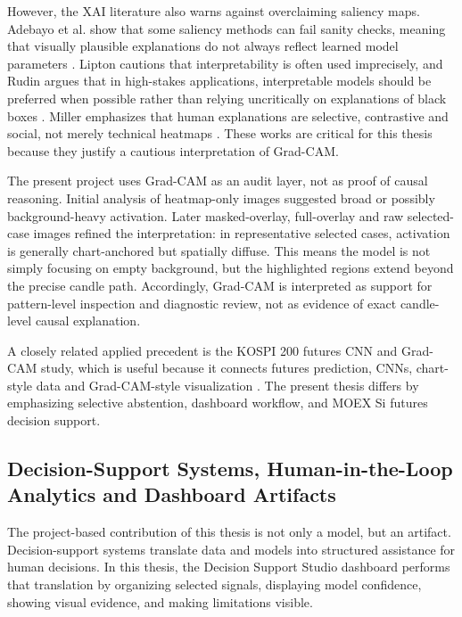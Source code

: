 However, the XAI literature also warns against overclaiming saliency maps. Adebayo et al. show that some saliency methods can fail sanity checks, meaning that visually plausible explanations do not always reflect learned model parameters \cite{adebayo_sanity_checks}. Lipton cautions that interpretability is often used imprecisely, and Rudin argues that in high-stakes applications, interpretable models should be preferred when possible rather than relying uncritically on explanations of black boxes \cite{lipton_mythos,rudin_black_boxes}. Miller emphasizes that human explanations are selective, contrastive and social, not merely technical heatmaps \cite{miller_explanation}. These works are critical for this thesis because they justify a cautious interpretation of Grad-CAM.

The present project uses Grad-CAM as an audit layer, not as proof of causal reasoning. Initial analysis of heatmap-only images suggested broad or possibly background-heavy activation. Later masked-overlay, full-overlay and raw selected-case images refined the interpretation: in representative selected cases, activation is generally chart-anchored but spatially diffuse. This means the model is not simply focusing on empty background, but the highlighted regions extend beyond the precise candle path. Accordingly, Grad-CAM is interpreted as support for pattern-level inspection and diagnostic review, not as evidence of exact candle-level causal explanation.

A closely related applied precedent is the KOSPI 200 futures CNN and Grad-CAM study, which is useful because it connects futures prediction, CNNs, chart-style data and Grad-CAM-style visualization \cite{kim_kospi_gradcam}. The present thesis differs by emphasizing selective abstention, dashboard workflow, and MOEX Si futures decision support.

\subsection{Decision-Support Systems, Human-in-the-Loop Analytics and Dashboard Artifacts}
\label{subsec:decision_support}

The project-based contribution of this thesis is not only a model, but an artifact. Decision-support systems translate data and models into structured assistance for human decisions. In this thesis, the Decision Support Studio dashboard performs that translation by organizing selected signals, displaying model confidence, showing visual evidence, and making limitations visible.

